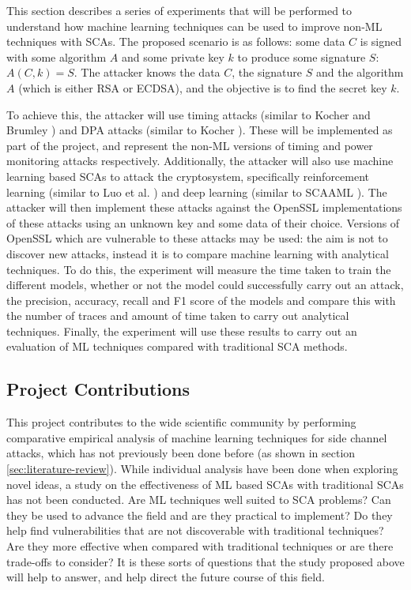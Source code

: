 \documentclass[a4paper,oneside,11pt]{article}
\begin{document}
This section describes a series of experiments that will be performed to
understand how machine learning techniques can be used to improve non-ML
techniques with SCAs. The proposed scenario is as follows: some data \( C
\) is signed with some algorithm \( A \) and some private key \( k \) to
produce some signature \( S \): \( A(C, k) = S \). The attacker knows the
data \( C \), the signature \( S \) and the algorithm \( A \) (which is either
RSA or ECDSA), and the objective is to find the secret key \( k \).

To achieve this, the attacker will use timing attacks (similar to Kocher and
Brumley \cite{A/Kocher-1996-Timing, A/Brumley-2011-Remote-TAs,
A/Brumley-2005-Remote-TAs}) and DPA attacks (similar to Kocher
\cite{A/Kocher-1999-DPA}). These will be implemented as part of the project,
and represent the non-ML versions of timing and power monitoring attacks
respectively. Additionally, the attacker will also use machine learning based
SCAs to attack the cryptosystem, specifically reinforcement learning (similar
to Luo et al. \cite{A/Luo-2023-AutoCAT}) and deep learning (similar to SCAAML
\cite{W/SCAAML}). The attacker will then implement these attacks against the
OpenSSL implementations of these attacks using an unknown key and some data of
their choice. Versions of OpenSSL which are vulnerable to these attacks may be
used: the aim is not to discover new attacks, instead it is to compare machine
learning with analytical techniques. To do this, the experiment will measure
the time taken to train the different models, whether or not the model could
successfully carry out an attack, the precision, accuracy, recall and F1 score
of the models and compare this with the number of traces and amount of time
taken to carry out analytical techniques. Finally, the experiment will use
these results to carry out an evaluation of ML techniques compared with
traditional SCA methods.



\subsection{Project Contributions}

This project contributes to the wide scientific community by performing
comparative empirical analysis of machine learning techniques for side channel
attacks, which has not previously been done before (as shown in section
\ref{sec:literature-review}). While individual analysis have been done when
exploring novel ideas, a study on the effectiveness of ML based SCAs with
traditional SCAs has not been conducted. Are ML techniques well suited to SCA
problems? Can they be used to advance the field and are they practical to
implement? Do they help find vulnerabilities that are not discoverable with
traditional techniques? Are they more effective when compared with traditional
techniques or are there trade-offs to consider? It is these sorts of questions
that the study proposed above will help to answer, and help direct the future
course of this field.
\end{document}
